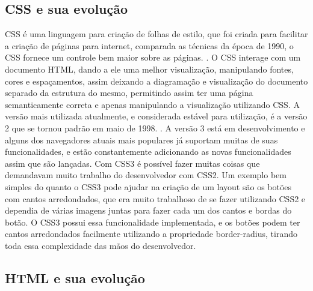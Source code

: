 \subsection{CSS e sua evolução}

CSS é uma linguagem para criação de folhas de estilo, que foi criada
para facilitar a criação de páginas para internet, comparada as técnicas da época de
1990, o CSS fornece um controle bem maior sobre as páginas. \cite{schmitt2009css}.
O CSS interage com um documento HTML, dando a ele uma melhor visualização, manipulando
fontes, cores e espaçamentos, assim deixando a diagramação e visualização do documento
separado da estrutura do mesmo, permitindo assim ter uma página semanticamente correta
e apenas manipulando a visualização utilizando CSS.
A versão mais utilizada atualmente, e considerada estável para utilização, é a versão 2
que se tornou padrão em maio de 1998. \cite{zeldman2009designing}.
A versão 3 está em desenvolvimento e alguns dos navegadores atuais mais populares
já suportam muitas de suas funcionalidades, e estão constantemente
adicionando as novas funcionalidades assim que são lançadas.
Com CSS3 é possível fazer muitas coisas que demandavam muito trabalho
do desenvolvedor com CSS2. Um exemplo bem simples do quanto o CSS3
pode ajudar na criação de um layout são os botões com cantos
arredondados, que era muito trabalhoso de se fazer utilizando CSS2 e
dependia de várias imagens juntas para fazer cada um dos cantos e
bordas do botão. O CSS3 possui essa funcionalidade implementada, e os
botões podem ter cantos arredondados facilmente utilizando a
propriedade border-radius, tirando toda essa complexidade das mãos do
desenvolvedor.

\subsection{HTML e sua evolução}

